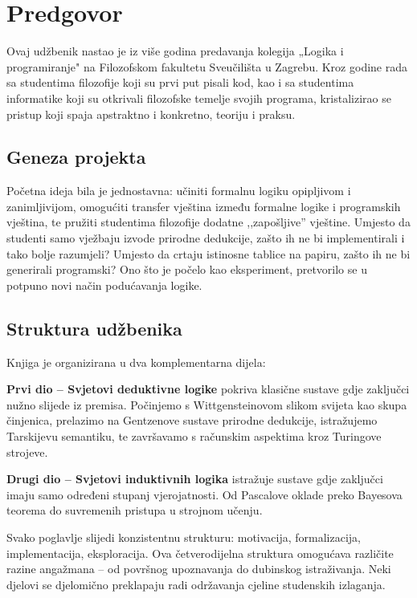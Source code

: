 \chapter*{Predgovor}

Ovaj udžbenik nastao je iz više godina predavanja kolegija „Logika i programiranje" na Filozofskom fakultetu
Sveučilišta u Zagrebu.
Kroz godine rada sa studentima filozofije koji su prvi put pisali kod,
kao i sa studentima informatike koji su otkrivali filozofske temelje svojih programa,
kristalizirao se  pristup koji spaja apstraktno i konkretno, teoriju i praksu.

\section*{Geneza projekta}

Početna ideja bila je jednostavna: učiniti formalnu logiku opipljivom i zanimljivijom, omogućiti transfer vještina između formalne logike i programskih vještina,
te pružiti studentima filozofije dodatne ,,zapošljive'' vještine.
Umjesto da studenti samo vježbaju izvode prirodne dedukcije, zašto ih ne bi implementirali i tako bolje razumjeli?
Umjesto da crtaju istinosne tablice na papiru, zašto ih ne bi generirali programski?
Ono što je počelo kao eksperiment, pretvorilo se u potpuno novi način podućavanja logike.

\section*{Struktura udžbenika}

Knjiga je organizirana u dva komplementarna dijela:

\textbf{Prvi dio – Svjetovi deduktivne logike} pokriva klasične sustave gdje zaključci nužno slijede iz premisa. Počinjemo s Wittgensteinovom slikom svijeta kao skupa činjenica, prelazimo na Gentzenove sustave prirodne dedukcije, istražujemo Tarskijevu semantiku, te završavamo s računskim aspektima kroz Turingove strojeve.

\textbf{Drugi dio – Svjetovi induktivnih logika} istražuje sustave gdje zaključci imaju samo određeni stupanj vjerojatnosti. Od Pascalove oklade preko Bayesova teorema do suvremenih pristupa u strojnom učenju.

Svako poglavlje slijedi konzistentnu strukturu: motivacija, formalizacija, implementacija, eksploracija.
Ova četverodijelna struktura omogućava različite razine angažmana – od površnog upoznavanja do dubinskog istraživanja.
Neki djelovi se djelomično preklapaju radi održavanja cjeline studenskih izlaganja.

